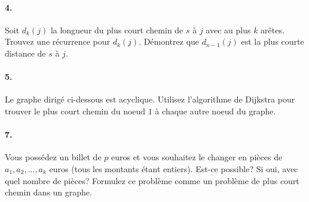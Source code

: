 \paragraph{4. } Soit $d_k(j)$ la longueur du plus court chemin de $s$ à $j$ avec au plus $k$ arêtes. Trouvez une récurrence pour $d_k(j)$. Démontrez que $d_{n-1}(j)$ est la plus courte distance de $s$ à $j$.

\paragraph{5. } Le graphe dirigé ci-dessous est acyclique. Utilisez l'algorithme de Dijkstra pour trouver le plus court chemin du noeud $1$ à chaque autre noeud du graphe.

\begin{center}
\end{center}



\paragraph{7. }
	Vous possédez un billet de $p$ euros et vous souhaitez le changer en pièces de $a_1, a_2, ..., a_k$ euros (tous les montants étant entiers). Est-ce possible? Si oui, avec quel nombre de pièces? Formulez ce problème comme un problème de plus court chemin dans un graphe.


